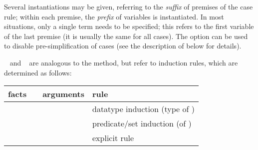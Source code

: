 \begin{isabellebody}
\begin{isamarkuptext}
\begin{description}
  Several instantiations may be given, referring to the \emph{suffix}
  of premises of the case rule; within each premise, the \emph{prefix}
  of variables is instantiated.  In most situations, only a single
  term needs to be specified; this refers to the first variable of the
  last premise (it is usually the same for all cases).  The  option can be used to disable pre-simplification of
  cases (see the description of \hyperlink{method.induct}{\mbox{}} below for details).

  \item \hyperlink{method.induct}{\mbox{}}~ and
  \hyperlink{method.induction}{\mbox{}}~ are analogous to the
  \hyperlink{method.cases}{\mbox{}} method, but refer to induction rules, which are
  determined as follows:

  \medskip
  \begin{tabular}{llll}
    facts           &                  & arguments            & rule \\\hline
                    & \hyperlink{method.induct}{\mbox{\isa{induct}}} & \isa{{\isaliteral{22}{\isachardoublequote}}P\ x{\isaliteral{22}{\isachardoublequote}}}        & datatype induction (type of \isa{x}) \\
    \isa{{\isaliteral{22}{\isachardoublequote}}{\isaliteral{5C3C7475726E7374696C653E}{\isasymturnstile}}\ A\ x{\isaliteral{22}{\isachardoublequote}}} & \hyperlink{method.induct}{\mbox{\isa{induct}}} & \isa{{\isaliteral{22}{\isachardoublequote}}{\isaliteral{5C3C646F74733E}{\isasymdots}}{\isaliteral{22}{\isachardoublequote}}}          & predicate/set induction (of \isa{A}) \\
    \isa{{\isaliteral{22}{\isachardoublequote}}{\isaliteral{5C3C646F74733E}{\isasymdots}}{\isaliteral{22}{\isachardoublequote}}}     & \hyperlink{method.induct}{\mbox{\isa{induct}}} & \isa{{\isaliteral{22}{\isachardoublequote}}{\isaliteral{5C3C646F74733E}{\isasymdots}}\ rule{\isaliteral{3A}{\isacharcolon}}\ R{\isaliteral{22}{\isachardoublequote}}} & explicit rule \isa{R} \\
  \end{tabular}
  \medskip
  

\end{description}
\end{isamarkuptext}
\end{isabellebody}
